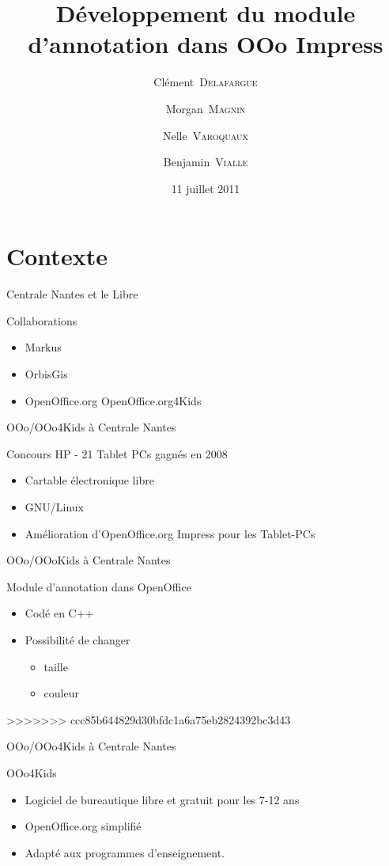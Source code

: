 \documentclass[handout]{beamer}
\title{Développement du module d'annotation dans OOo Impress}
\author{Clément~\textsc{Delafargue} \and Morgan~\textsc{Magnin} \and Nelle~\textsc{Varoquaux}\and Benjamin~\textsc{Vialle}}
\institute[\textsc{ECN}]{École Centrale de Nantes}
\date{11 juillet 2011}
\begin{document}
\frame{\titlepage}

\section{Contexte}

\begin{frame}{Centrale Nantes et le Libre}
    \begin{block}{Collaborations}
	\begin{itemize}[<+->]
	    \item Markus
	    \item OrbisGis
	    \item OpenOffice.org OpenOffice.org4Kids
	\end{itemize}
    \end{block}
\end{frame}

\begin{frame}{OOo/OOo4Kids à Centrale Nantes}
    \begin{block}{Concours HP - 21 Tablet PCs gagnés en 2008}
	\begin{itemize}[<+->]
	    \item Cartable électronique libre
            \item GNU/Linux
            \item Amélioration d'OpenOffice.org Impress pour les Tablet-PCs
	\end{itemize}
    \end{block}
\end{frame}

\begin{frame}{OOo/OOoKids à Centrale Nantes}
    \begin{block}{Module d'annotation dans OpenOffice}
	\begin{itemize}
	    \item Codé en C++
	    \item Possibilité de changer
	    \begin{itemize}
		\item taille
		\item couleur
	    \end{itemize}
	\end{itemize}
    \end{block}
\end{frame}

>>>>>>> ccc85b644829d30bfdc1a6a75eb2824392bc3d43
\begin{frame}{OOo/OOo4Kids à Centrale Nantes}
    \begin{block}{OOo4Kids}
	\begin{itemize}[<+->]
	    \item Logiciel de bureautique libre et gratuit pour les 7-12 ans
	    \item OpenOffice.org simplifié
	    \item Adapté aux programmes d'enseignement.
	\end{itemize}
    \end{block}
\end{frame}
\end{document}
